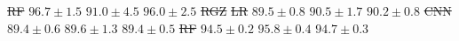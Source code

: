 \documentclass[11pt, a4paper]{book}
\providecommand{\DIFdeltex}[1]{{\protect\color{red}\sout{#1}}}                      %
\providecommand{\DIFdelFL}[1]{\DIFdel{#1}} %
\providecommand{\DIFdel}[1]{\texorpdfstring{\DIFdeltex{#1}}{}} %
\begin{document}
\DIFdelFL{RF }%
\DIFdelFL{$96.7 \pm 1.5$ }%
\DIFdelFL{$91.0 \pm 4.5$ }%
\DIFdelFL{$96.0 \pm 2.5$}%
\DIFdelFL{RGZ }%
\DIFdelFL{LR }%
\DIFdelFL{$89.5 \pm 0.8$ }%
\DIFdelFL{$90.5 \pm 1.7$ }%
\DIFdelFL{$90.2 \pm 0.8$}%
\DIFdelFL{CNN }%
\DIFdelFL{$89.4 \pm 0.6$ }%
\DIFdelFL{$89.6 \pm 1.3$ }%
\DIFdelFL{$89.4 \pm 0.5$}%
\DIFdelFL{RF }%
\DIFdelFL{$94.5 \pm 0.2$ }%
\DIFdelFL{$95.8 \pm 0.4$ }%
\DIFdelFL{$94.7 \pm 0.3$}%
\end{document}
